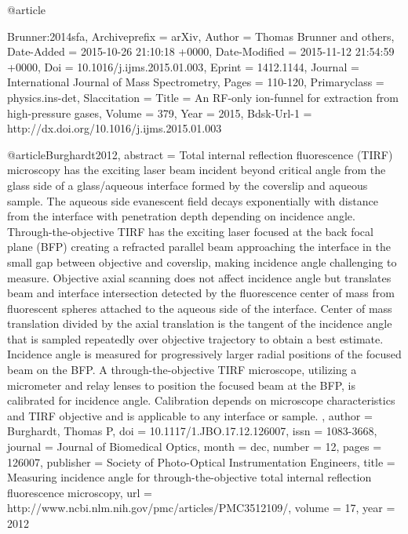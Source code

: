 {{{{{{{{{{@article{Brunner:2014sfa,
	Archiveprefix = {arXiv},
	Author = {Thomas Brunner and others},
	Date-Added = {2015-10-26 21:10:18 +0000},
	Date-Modified = {2015-11-12 21:54:59 +0000},
	Doi = {10.1016/j.ijms.2015.01.003},
	Eprint = {1412.1144},
	Journal = {International Journal of Mass Spectrometry},
	Pages = {110-120},
	Primaryclass = {physics.ins-det},
	Slaccitation = {%
	Title = {{An RF-only ion-funnel for extraction from high-pressure gases}},
	Volume = {379},
	Year = {2015},
	Bdsk-Url-1 = {http://dx.doi.org/10.1016/j.ijms.2015.01.003}}

@article{Burghardt2012,
abstract = {Total internal reflection fluorescence (TIRF) microscopy has the exciting laser beam incident beyond critical angle from the glass side of a glass/aqueous interface formed by the coverslip and aqueous sample. The aqueous side evanescent field decays exponentially with distance from the interface with penetration depth depending on incidence angle. Through-the-objective TIRF has the exciting laser focused at the back focal plane (BFP) creating a refracted parallel beam approaching the interface in the small gap between objective and coverslip, making incidence angle challenging to measure. Objective axial scanning does not affect incidence angle but translates beam and interface intersection detected by the fluorescence center of mass from fluorescent spheres attached to the aqueous side of the interface. Center of mass translation divided by the axial translation is the tangent of the incidence angle that is sampled repeatedly over objective trajectory to obtain a best estimate. Incidence angle is measured for progressively larger radial positions of the focused beam on the BFP. A through-the-objective TIRF microscope, utilizing a micrometer and relay lenses to position the focused beam at the BFP, is calibrated for incidence angle. Calibration depends on microscope characteristics and TIRF objective and is applicable to any interface or sample. },
author = {Burghardt, Thomas P},
doi = {10.1117/1.JBO.17.12.126007},
issn = {1083-3668},
journal = {Journal of Biomedical Optics},
month = {dec},
number = {12},
pages = {126007},
publisher = {Society of Photo-Optical Instrumentation Engineers},
title = {{Measuring incidence angle for through-the-objective total internal reflection fluorescence microscopy}},
url = {http://www.ncbi.nlm.nih.gov/pmc/articles/PMC3512109/},
volume = {17},
year = {2012}
}

}}}}}}}}}}}
